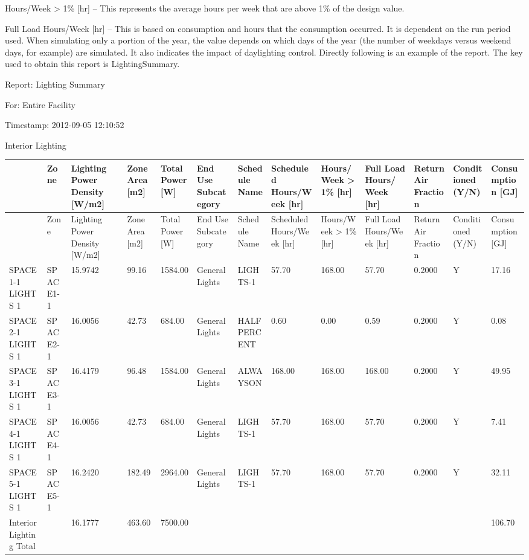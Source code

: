 Hours/Week \textgreater{} 1\% {[}hr{]} -- This represents the average hours per week that are above 1\% of the design value.

Full Load Hours/Week {[}hr{]} -- This is based on consumption and hours that the consumption occurred. It is dependent on the run period used. When simulating only a portion of the year, the value depends on which days of the year (the number of weekdays versus weekend days, for example) are simulated. It also indicates the impact of daylighting control. Directly following is an example of the report. The key used to obtain this report is LightingSummary.

Report: Lighting Summary

For: Entire Facility

Timestamp: 2012-09-05 12:10:52

Interior Lighting

{\scriptsize
\begin{longtable}[c]{>{\raggedright}p{0.46in}>{\raggedright}p{0.46in}>{\raggedright}p{0.46in}>{\raggedright}p{0.46in}>{\raggedright}p{0.46in}>{\raggedright}p{0.46in}>{\raggedright}p{0.46in}>{\raggedright}p{0.46in}>{\raggedright}p{0.46in}>{\raggedright}p{0.46in}>{\raggedright}p{0.46in}>{\raggedright}p{0.46in}>{\raggedright}p{0.46in}}
\toprule
 & Zone & Lighting Power Density [W/m2] & Zone Area [m2] & Total Power [W] & End Use Subcategory & Schedule Name & Scheduled Hours/Week [hr] & Hours/Week  >  1\% [hr] & Full Load Hours/Week [hr] & Return Air Fraction & Conditioned (Y/N) & Consumption [GJ] \tabularnewline
\midrule
\endfirsthead

\toprule
 & Zone & Lighting Power Density [W/m2] & Zone Area [m2] & Total Power [W] & End Use Subcategory & Schedule Name & Scheduled Hours/Week [hr] & Hours/Week  >  1\% [hr] & Full Load Hours/Week [hr] & Return Air Fraction & Conditioned (Y/N) & Consumption [GJ] \tabularnewline
\midrule
\endhead

SPACE1-1 LIGHTS 1 & SPACE1-1 & 15.9742 & 99.16 & 1584.00 & GeneralLights & LIGHTS-1 & 57.70 & 168.00 & 57.70 & 0.2000 & Y & 17.16 \tabularnewline
SPACE2-1 LIGHTS 1 & SPACE2-1 & 16.0056 & 42.73 & 684.00 & GeneralLights & HALFPERCENT & 0.60 & 0.00 & 0.59 & 0.2000 & Y & 0.08 \tabularnewline
SPACE3-1 LIGHTS 1 & SPACE3-1 & 16.4179 & 96.48 & 1584.00 & GeneralLights & ALWAYSON & 168.00 & 168.00 & 168.00 & 0.2000 & Y & 49.95 \tabularnewline
SPACE4-1 LIGHTS 1 & SPACE4-1 & 16.0056 & 42.73 & 684.00 & GeneralLights & LIGHTS-1 & 57.70 & 168.00 & 57.70 & 0.2000 & Y & 7.41 \tabularnewline
SPACE5-1 LIGHTS 1 & SPACE5-1 & 16.2420 & 182.49 & 2964.00 & GeneralLights & LIGHTS-1 & 57.70 & 168.00 & 57.70 & 0.2000 & Y & 32.11 \tabularnewline
Interior Lighting Total & ~ & 16.1777 & 463.60 & 7500.00 & ~ & ~ & ~ & ~ & ~ & ~ & ~ & 106.70 \tabularnewline
\bottomrule
\end{longtable}}

